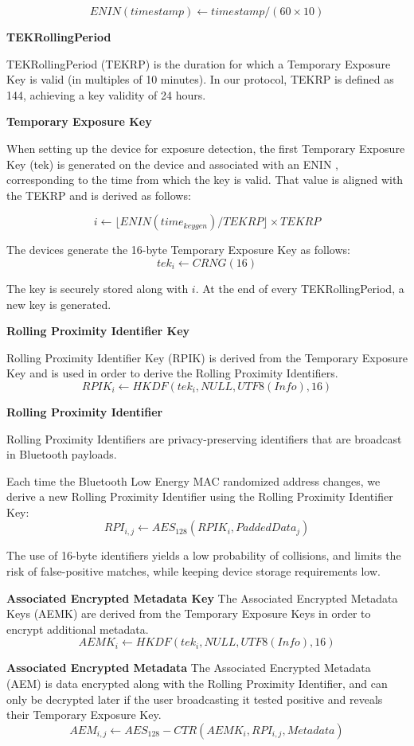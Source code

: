 \documentclass[11pt,en]{elegantpaper}
\begin{document}
$$ENIN(timestamp)\leftarrow timestamp/(60\times 10)$$

\textbf{TEKRollingPeriod}

TEKRollingPeriod (TEKRP) is the duration for which a Temporary Exposure Key is valid (in multiples of 10 minutes). In our protocol, TEKRP is defined as 144, achieving a key validity of 24 hours. 

\textbf{Temporary Exposure Key}

When setting up the device for exposure detection, the first Temporary Exposure Key (tek) is generated on the device and associated with an ENIN , corresponding to the time from which the
key is valid. That value is aligned with the TEKRP and is derived as follows: 

$$i\leftarrow \lfloor ENIN(time_{keygen})/TEKRP\rfloor \times TEKRP$$

The devices generate the 16-byte Temporary Exposure Key as follows: 
$$tek_i\leftarrow CRNG(16)$$

The key is securely stored along with $i$. At the end of every TEKRollingPeriod, a new key is generated. 

\textbf{Rolling Proximity Identifier Key}

Rolling Proximity Identifier Key (RPIK) is derived from the Temporary Exposure Key and is used in
order to derive the Rolling Proximity Identifiers\cite{hirmer2020techniques}. 
$$RPIK_i\leftarrow HKDF(tek_i,NULL,UTF8(Info), 16)$$

\textbf{Rolling Proximity Identifier}

Rolling Proximity Identifiers are privacy-preserving identifiers that are broadcast in Bluetooth payloads.

Each time the Bluetooth Low Energy MAC randomized address changes, we derive a new Rolling
Proximity Identifier using the Rolling Proximity Identifier Key: 
$$RPI_{i,j}\leftarrow AES_{128}(RPIK_i,PaddedData_j)$$

The use of 16-byte identifiers yields a low probability of collisions, and limits the risk of false-positive matches, while keeping device storage requirements low. 

\textbf{Associated Encrypted Metadata Key}
The Associated Encrypted Metadata Keys (AEMK) are derived from the Temporary Exposure Keys in order to encrypt additional metadata.
$$AEMK_i\leftarrow HKDF(tek_i,NULL,UTF8(Info), 16)$$

\textbf{Associated Encrypted Metadata}
The Associated Encrypted Metadata (AEM) is data encrypted along with the Rolling Proximity Identifier, and can only be decrypted later if the user broadcasting it tested positive and reveals their Temporary Exposure Key\cite{keselman2020homomorphic}. 
$$AEM_{i,j}\leftarrow AES_{128}-CTR(AEMK_i,RPI_{i,j},Metadata)$$
\end{document}
